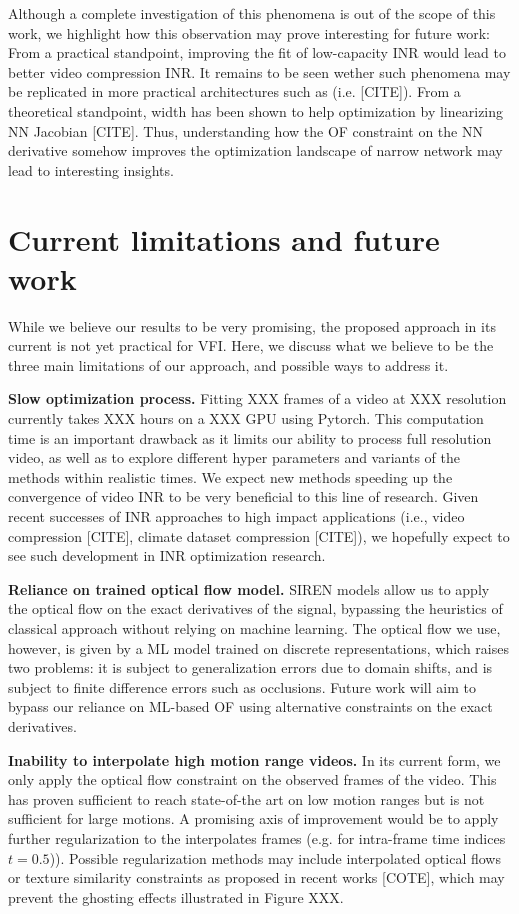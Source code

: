 \documentclass{article}
\begin{document}
Although a complete investigation of this phenomena is out of the scope of this work,
we highlight how this observation may prove interesting for future work:
From a practical standpoint, improving the fit of low-capacity INR would lead to better video compression INR.
It remains to be seen wether such phenomena may be replicated in more practical architectures such as (i.e. [CITE]).
From a theoretical standpoint, width has been shown to help optimization by linearizing NN Jacobian [CITE].
Thus, understanding how the OF constraint on the NN derivative somehow improves
the optimization landscape of narrow network may lead to interesting insights.

\section{Current limitations and future work}

While we believe our results to be very promising, the proposed approach in its current is not yet practical for VFI.
Here, we discuss what we believe to be the three main limitations of our approach,
and possible ways to address it.

\textbf{Slow optimization process.} Fitting XXX frames of a video at XXX resolution currently takes XXX hours on a XXX GPU using Pytorch.
This computation time is an important drawback as it limits our ability to process full resolution video,
 as well as to explore different hyper parameters and variants of the methods within realistic times.
We expect new methods speeding up the convergence of video INR to be very beneficial to this line of research.
Given recent successes of INR approaches to high impact applications (i.e., video compression [CITE], climate dataset compression [CITE]),
we hopefully expect to see such development in INR optimization research.

\textbf{Reliance on trained optical flow model.}
SIREN models allow us to apply the optical flow on the exact derivatives of the signal,
bypassing the heuristics of classical approach without relying on machine learning.
The optical flow we use, however, is given by a ML model trained on discrete representations, which raises two problems:
it is subject to generalization errors due to domain shifts,
and is subject to finite difference errors such as occlusions.
Future work will aim to bypass our reliance on ML-based OF using alternative constraints on the exact derivatives.

\textbf{Inability to interpolate high motion range videos.}
In its current form, we only apply the optical flow constraint on the observed frames of the video.
This has proven sufficient to reach state-of-the art on low motion ranges but is not sufficient for large motions.
A promising axis of improvement would be to apply further regularization to the interpolates frames (e.g. for intra-frame time indices $t=0.5$)).
Possible regularization methods may include interpolated optical flows or texture similarity constraints as proposed in recent works [COTE],
which may prevent the ghosting effects illustrated in Figure XXX.
\end{document}
